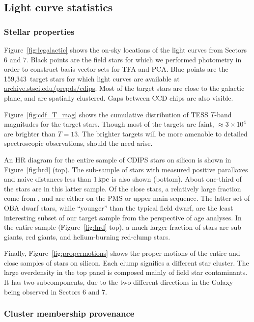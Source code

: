 \documentclass[12pt,twocolumn,tighten]{aastex62}
\newcommand{\numberlcs}{159{,}343\ } %
\newcommand{\stscilink}{\url{archive.stsci.edu/prepds/cdips}}
\begin{document}
\subsection{Light curve statistics}
\label{subsec:lcstatistics}

\subsubsection{Stellar properties}

Figure~\ref{fig:lcgalactic} shows the on-sky locations of the light
curves from Sectors 6 and 7.  Black points are the field stars for
which we performed photometry in order to construct basis vector sets
for TFA and PCA.  Blue points are the \numberlcs target stars for
which light curves are available at \stscilink.  Most of the target
stars are close to the galactic plane, and are spatially clustered.
Gaps between CCD chips are also visible.

Figure~\ref{fig:cdf_T_mag} shows the cumulative distribution of TESS
$T$-band magnitudes for the target stars.  Though most of the targets
are faint, $\approx3\times10^4$ are brighter than $T=13$. The brighter
targets will be more amenable to detailed spectroscopic observations,
should the need arise.

An HR diagram for the entire sample of CDIPS stars on silicon is shown
in Figure~\ref{fig:hrd} (top).  The sub-sample of stars with measured
positive parallaxes and naive distances less than $1\,{\rm kpc}$ is
also shown (bottom).  About one-third of the stars are in this latter
sample.  Of the close stars, a relatively large fraction come from
\citet{zari_3d_2018}, and are either on the PMS or upper
main-sequence.  The latter set of OBA dwarf stars, while ``younger''
than the typical field dwarf, are the least interesting subset of our
target sample from the perspective of age analyses.  In the entire
sample (Figure~\ref{fig:hrd} top), a much larger fraction of stars are
sub-giants, red giants, and helium-burning red-clump stars.

Finally, Figure~\ref{fig:propermotions} shows the proper motions of
the entire and close samples of stars on silicon.  Each clump
signifies a different star cluster. The large overdensity in the top
panel is composed mainly of field star contaminants. It has two
subcomponents, due to the two different directions in the Galaxy being
observed in Sectors 6 and 7.


\subsubsection{Cluster membership provenance}
\end{document}
